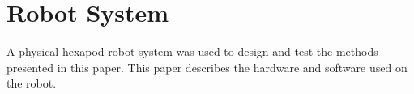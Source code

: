 \section{ Robot System }

A physical hexapod robot system was used to design and test the methods presented in this paper. This paper describes the hardware and software used on the robot.





% 

